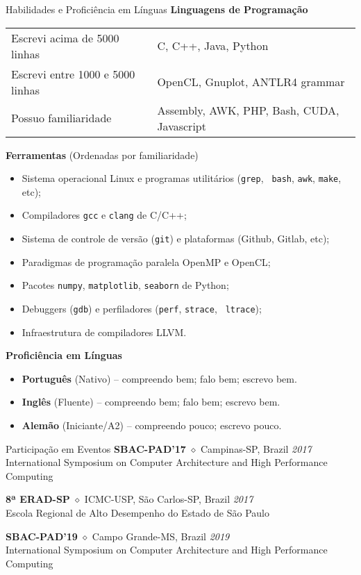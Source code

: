 \documentclass[a4paper]{resume}
\begin{document}

\begin{rSection}{Habilidades e Proficiência em Línguas}
{\bf Linguagens de Programação}

\begin{tabular}{ll}
  Escrevi acima de 5000 linhas & C, C++, Java, Python \\
  Escrevi entre 1000 e 5000 linhas & OpenCL, Gnuplot, ANTLR4 grammar \\
  Possuo familiaridade & Assembly, AWK, PHP, Bash, CUDA, Javascript \\
\end{tabular}

{\bf Ferramentas} {\small (Ordenadas por familiaridade)}
\begin{itemize}[noitemsep]
  \item Sistema operacional Linux e programas utilitários ({\tt grep}, {\tt
    bash}, {\tt awk}, {\tt make}, etc);
  \item Compiladores {\tt gcc} e {\tt clang} de C/C++;
  \item Sistema de controle de versão ({\tt git}) e plataformas (Github, Gitlab,
    etc);
  \item Paradigmas de programação paralela OpenMP e OpenCL;
  \item Pacotes {\tt numpy}, {\tt matplotlib}, {\tt seaborn} de Python;
  \item Debuggers ({\tt gdb}) e perfiladores ({\tt perf}, {\tt strace}, {\tt
    ltrace});
  \item Infraestrutura de compiladores LLVM.
\end{itemize}

{\bf Proficiência em Línguas}
\begin{itemize}[noitemsep]
  \item {\bf Português} (Nativo) -- compreendo bem; falo bem; escrevo bem.
  \item {\bf Inglês} (Fluente) -- compreendo bem; falo bem; escrevo bem.
  \item {\bf Alemão} (Iniciante/A2) -- compreendo pouco; escrevo pouco.
\end{itemize}
\end{rSection}

\begin{rSection}{Participação em Eventos}
{\bf SBAC-PAD'17} $\diamond$ Campinas-SP, Brazil \hfill {\em 2017} \\
International Symposium on Computer Architecture and High Performance
Computing

{\bf 8ª ERAD-SP} $\diamond$ ICMC-USP, São Carlos-SP, Brazil \hfill {\em 2017} \\
Escola Regional de Alto Desempenho do Estado de São Paulo

{\bf SBAC-PAD'19} $\diamond$ Campo Grande-MS, Brazil \hfill {\em 2019} \\
International Symposium on Computer Architecture and High Performance
Computing
\end{rSection}
\end{document}
